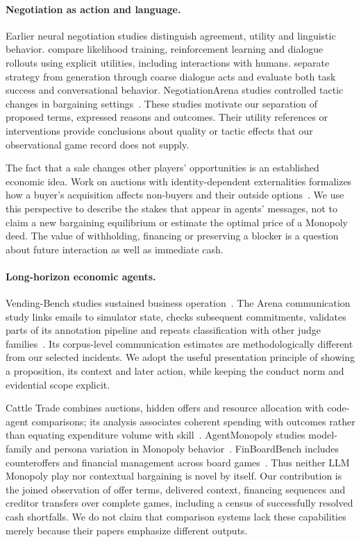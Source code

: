 \paragraph{Negotiation as action and language.}
Earlier neural negotiation studies distinguish agreement, utility and linguistic behavior. \citet{lewis2017deal} compare likelihood training, reinforcement learning and dialogue rollouts using explicit utilities, including interactions with humans. \citet{he2018decoupling} separate strategy from generation through coarse dialogue acts and evaluate both task success and conversational behavior. NegotiationArena studies controlled tactic changes in bargaining settings~\cite{bianchi2024negotiationarena}. These studies motivate our separation of proposed terms, expressed reasons and outcomes. Their utility references or interventions provide conclusions about quality or tactic effects that our observational game record does not supply.

The fact that a sale changes other players' opportunities is an established economic idea. Work on auctions with identity-dependent externalities formalizes how a buyer's acquisition affects non-buyers and their outside options~\cite{jehiel1996externalities}. We use this perspective to describe the stakes that appear in agents' messages, not to claim a new bargaining equilibrium or estimate the optimal price of a Monopoly deed. The value of withholding, financing or preserving a blocker is a question about future interaction as well as immediate cash.

\paragraph{Long-horizon economic agents.}
Vending-Bench studies sustained business operation~\cite{backlund2025vendingbench}. The Arena communication study links emails to simulator state, checks subsequent commitments, validates parts of its annotation pipeline and repeats classification with other judge families~\cite{li2026arena}. Its corpus-level communication estimates are methodologically different from our selected incidents. We adopt the useful presentation principle of showing a proposition, its context and later action, while keeping the conduct norm and evidential scope explicit.

Cattle Trade combines auctions, hidden offers and resource allocation with code-agent comparisons; its analysis associates coherent spending with outcomes rather than equating expenditure volume with skill~\cite{muller2026cattletrade}. AgentMonopoly studies model-family and persona variation in Monopoly behavior~\cite{wu2026agentmonopoly}. FinBoardBench includes counteroffers and financial management across board games~\cite{hu2026finboardbench}. Thus neither LLM Monopoly play nor contextual bargaining is novel by itself. Our contribution is the joined observation of offer terms, delivered context, financing sequences and creditor transfers over complete games, including a census of successfully resolved cash shortfalls. We do not claim that comparison systems lack these capabilities merely because their papers emphasize different outputs.

